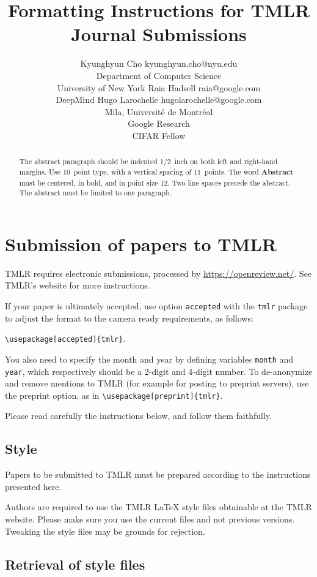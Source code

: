 \documentclass[10pt]{article} %
\title{Formatting Instructions for TMLR \\Journal Submissions}
\author{\name Kyunghyun Cho \email kyunghyun.cho@nyu.edu \\
      \addr Department of Computer Science\\
      University of New York
      \AND
      \name Raia Hadsell \email raia@google.com \\
      \addr DeepMind
      \AND
      \name Hugo Larochelle \email hugolarochelle@google.com\\
      \addr Mila, Universit\'e de Montr\'eal \\
      Google Research\\
      CIFAR Fellow}
\begin{document}
\maketitle

\begin{abstract}
  The abstract paragraph should be indented 1/2~inch on both left and
  right-hand margins. Use 10~point type, with a vertical spacing of 11~points.
  The word \textbf{\large Abstract} must be centered, in bold, and in point size 12. Two
  line spaces precede the abstract. The abstract must be limited to one
  paragraph.
\end{abstract}

\section{Submission of papers to TMLR}

TMLR requires electronic submissions, processed by \url{https://openreview.net/}. See
TMLR's website for more instructions.

If your paper is ultimately accepted, use option {\tt accepted} with the {\tt tmlr} package
to adjust the format to the camera ready requirements, as follows:
\begin{center}
  {\tt {\textbackslash}usepackage[accepted]\{tmlr\}}.
\end{center}
You also need to specify the month and year
by defining variables {\tt month} and {\tt year}, which respectively
should be a 2-digit and 4-digit number. To de-anonymize and remove mentions
to TMLR (for example for posting to preprint servers), use the preprint option,
as in {\tt {\textbackslash}usepackage[preprint]\{tmlr\}}.

Please read carefully the instructions below, and follow them faithfully.

\subsection{Style}

Papers to be submitted to TMLR must be prepared according to the instructions presented
here.

Authors are required to use the TMLR \LaTeX{} style files obtainable at the TMLR website.
Please make sure you use the current files and not previous versions. Tweaking the style
files may be grounds for rejection.

\subsection{Retrieval of style files}
\end{document}
